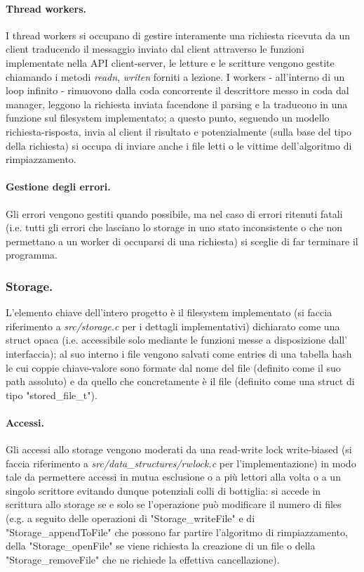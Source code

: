 \documentclass[11pt, italian, openany]{book}
\begin{document}
\begin{sloppypar}
\paragraph*{Thread workers.}
I thread workers si occupano di gestire interamente una richiesta ricevuta da un client traducendo il messaggio inviato dal client
attraverso le funzioni implementate nella API client-server, le letture e le scritture vengono gestite chiamando i metodi
\textit{readn}, \textit{writen} forniti a lezione. I workers - all'interno di un loop infinito - rimuovono dalla coda concorrente
il descrittore messo in coda dal manager, leggono la richiesta inviata facendone il parsing e la traducono in una funzione
sul filesystem implementato; a questo punto, seguendo un modello richiesta-risposta, invia al client il risultato e potenzialmente
(sulla base del tipo della richiesta) si occupa di inviare anche i file letti o le vittime dell'algoritmo di rimpiazzamento.

\paragraph*{Gestione degli errori.}
Gli errori vengono gestiti quando possibile, ma nel caso di errori ritenuti fatali (i.e. tutti gli errori che lasciano lo storage
in uno stato inconsistente o che non permettano a un worker di occuparsi di una richiesta) si sceglie di far terminare il programma.

\subsubsection{Storage.}
L'elemento chiave dell'intero progetto \`e il filesystem implementato (si faccia riferimento a \textit{src/storage.c} per i
dettagli implementativi) dichiarato come una struct opaca (i.e. accessibile solo mediante le funzioni messe a disposizione dall'
interfaccia); al suo interno i file vengono salvati come entries di una tabella hash le cui coppie chiave-valore sono formate
dal nome del file (definito come il suo path assoluto) e da quello che concretamente \`e il file (definito come una struct
di tipo "stored\_file\_t").

\paragraph*{Accessi.}
Gli accessi allo storage vengono moderati da una read-write lock write-biased (si faccia riferimento a
\textit{src/data\_structures/rwlock.c} per l'implementazione) in modo tale da permettere accessi in mutua esclusione o a pi\`u
lettori alla volta o a un singolo scrittore evitando dunque potenziali colli di bottiglia: si accede in scrittura allo storage se
e solo se l'operazione pu\`o modificare il numero di files (e.g. a seguito delle operazioni di "Storage\_writeFile" e di
"Storage\_appendToFile" che possono far partire l'algoritmo di rimpiazzamento, della "Storage\_openFile" se viene richiesta
la creazione di un file o della "Storage\_removeFile" che ne richiede la effettiva cancellazione).


\end{sloppypar}
\end{document}
